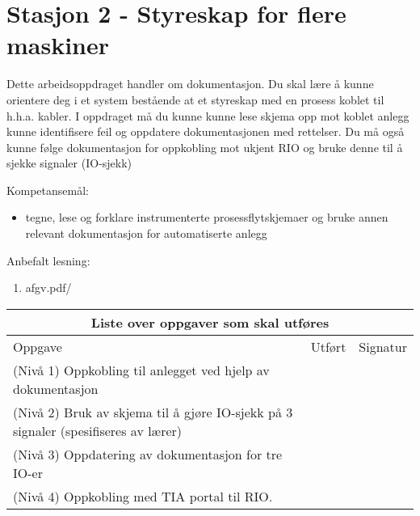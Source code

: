 
\noindent
\section*{Stasjon 2 - Styreskap for flere maskiner}

\vskip 5pt
Dette arbeidsoppdraget handler om dokumentasjon. Du skal lære å kunne orientere deg i et system bestående at et styreskap med en prosess koblet til h.h.a. kabler. I oppdraget må du kunne kunne lese skjema opp mot koblet anlegg kunne identifisere feil og oppdatere dokumentasjonen med rettelser. Du må også kunne følge dokumentasjon for oppkobling mot ukjent RIO og bruke denne til å sjekke signaler (IO-sjekk)

Kompetansemål:
\begin{itemize}[noitemsep]

	\item tegne, lese og forklare instrumenterte prosessflytskjemaer og bruke annen relevant dokumentasjon for automatiserte anlegg
\end{itemize}

Anbefalt lesning:

\begin{enumerate}
	\item afgv.pdf/ 
\end{enumerate}


\begin{center}
\begin{tabular}{ | m{10cm} | m{1cm}| m{2cm} | } 
\hline
\multicolumn{3}{|c|}{Liste over oppgaver som skal utføres} \\
	\hline
	Oppgave	& Utført & Signatur \\ 
	\hline
	\cellcolor{green!60}(Nivå 1) Oppkobling til anlegget ved hjelp av dokumentasjon	& & \\ 
	\hline
	\cellcolor{yellow!60}(Nivå 2) Bruk av skjema til å gjøre IO-sjekk på 3 signaler (spesifiseres av lærer)
	& & \\ 
	\hline
	\cellcolor{orange!60}(Nivå 3) Oppdatering av dokumentasjon for tre IO-er
	& & \\ 
	\hline
	\cellcolor{red!60}(Nivå 4) Oppkobling med TIA portal til RIO. 
	& & \\ 
	\hline
\end{tabular}
\end{center}

